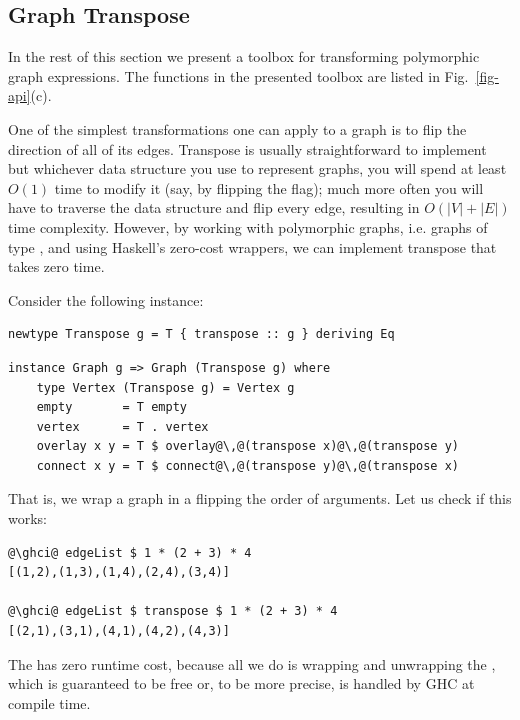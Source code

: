 \subsection{Graph Transpose}

In the rest of this section we present a toolbox for transforming polymorphic graph
expressions. The functions in the presented toolbox are listed in Fig.~\ref{fig-api}(c).

One of the simplest transformations one can apply to a graph is to flip the
direction of all of its edges. Transpose is usually straightforward to implement but
whichever data structure you use to represent graphs, you will spend at least
$O(1)$ time to modify it (say, by flipping the  flag);
much more often you will have to traverse the data structure and flip every edge,
resulting in $O(|V|+|E|)$ time complexity. However, by working with polymorphic
graphs, i.e. graphs of type , and using Haskell's
zero-cost  wrappers, we can implement transpose that takes zero time.

Consider the following  instance:

\begin{verbatim}
newtype Transpose g = T { transpose :: g } deriving Eq
\end{verbatim}
\vspace{1mm}
\begin{verbatim}
instance Graph g => Graph (Transpose g) where
    type Vertex (Transpose g) = Vertex g
    empty       = T empty
    vertex      = T . vertex
    overlay x y = T $ overlay@\,@(transpose x)@\,@(transpose y)
    connect x y = T $ connect@\,@(transpose y)@\,@(transpose x)
\end{verbatim}

\noindent
That is, we wrap a graph in a  flipping the order of  arguments.
Let us check if this works:

\begin{verbatim}
@\ghci@ edgeList $ 1 * (2 + 3) * 4
[(1,2),(1,3),(1,4),(2,4),(3,4)]

@\ghci@ edgeList $ transpose $ 1 * (2 + 3) * 4
[(2,1),(3,1),(4,1),(4,2),(4,3)]
\end{verbatim}

The  has zero runtime cost, because all we do is wrapping and unwrapping
the , which is guaranteed to be free or, to be more precise, is handled
by GHC at compile time.

